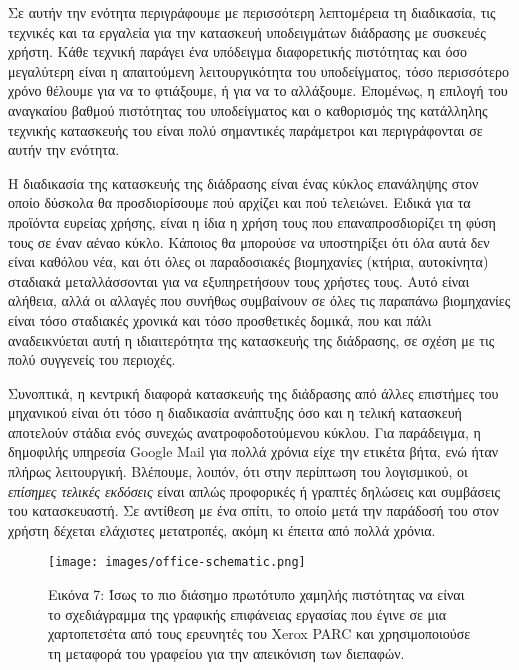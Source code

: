 \documentclass[
]{article}
\begin{document}
Σε αυτήν την ενότητα περιγράφουμε με περισσότερη λεπτομέρεια τη
διαδικασία, τις τεχνικές και τα εργαλεία για την κατασκευή υποδειγμάτων
διάδρασης με συσκευές χρήστη. Κάθε τεχνική παράγει ένα υπόδειγμα
διαφορετικής πιστότητας και όσο μεγαλύτερη είναι η απαιτούμενη
λειτουργικότητα του υποδείγματος, τόσο περισσότερο χρόνο θέλουμε για να
το φτιάξουμε, ή για να το αλλάξουμε. Επομένως, η επιλογή του αναγκαίου
βαθμού πιστότητας του υποδείγματος και ο καθορισμός της κατάλληλης
τεχνικής κατασκευής του είναι πολύ σημαντικές παράμετροι και
περιγράφονται σε αυτήν την ενότητα.

Η διαδικασία της κατασκευής της διάδρασης είναι ένας κύκλος επανάληψης
στον οποίο δύσκολα θα προσδιορίσουμε πού αρχίζει και πού τελειώνει.
Ειδικά για τα προϊόντα ευρείας χρήσης, είναι η ίδια η χρήση τους που
επαναπροσδιορίζει τη φύση τους σε έναν αέναο κύκλο. Κάποιος θα μπορούσε
να υποστηρίξει ότι όλα αυτά δεν είναι καθόλου νέα, και ότι όλες οι
παραδοσιακές βιομηχανίες (κτήρια, αυτοκίνητα) σταδιακά μεταλλάσσονται
για να εξυπηρετήσουν τους χρήστες τους. Αυτό είναι αλήθεια, αλλά οι
αλλαγές που συνήθως συμβαίνουν σε όλες τις παραπάνω βιομηχανίες είναι
τόσο σταδιακές χρονικά και τόσο προσθετικές δομικά, που και πάλι
αναδεικνύεται αυτή η ιδιαιτερότητα της κατασκευής της διάδρασης, σε
σχέση με τις πολύ συγγενείς του περιοχές.

Συνοπτικά, η κεντρική διαφορά κατασκευής της διάδρασης από άλλες
επιστήμες του μηχανικού είναι ότι τόσο η διαδικασία ανάπτυξης όσο και η
τελική κατασκευή αποτελούν στάδια ενός συνεχώς ανατροφοδοτούμενου
κύκλου. Για παράδειγμα, η δημοφιλής υπηρεσία Google Mail για πολλά
χρόνια είχε την ετικέτα βήτα, ενώ ήταν πλήρως λειτουργική. Βλέπουμε,
λοιπόν, ότι στην περίπτωση του λογισμικού, οι \emph{επίσημες τελικές
εκδόσεις} είναι απλώς προφορικές ή γραπτές δηλώσεις και συμβάσεις του
κατασκευαστή. Σε αντίθεση με ένα σπίτι, το οποίο μετά την παράδοσή του
στον χρήστη δέχεται ελάχιστες μετατροπές, ακόμη κι έπειτα από πολλά
χρόνια.

\leavevmode{}%
\begin{figure}
\hypertarget{fig:office-schematic}{%
\centering
\texttt{[image: images/office-schematic.png]}
\caption{Εικόνα 7: Ίσως το πιο διάσημο πρωτότυπο χαμηλής πιστότητας να
είναι το σχεδιάγραμμα της γραφικής επιφάνειας εργασίας που έγινε σε μια
χαρτοπετσέτα από τους ερευνητές του Xerox PARC και χρησιμοποιούσε τη
μεταφορά του γραφείου για την απεικόνιση των
διεπαφών.}\label{fig:office-schematic}
}
\end{figure}
\end{document}
